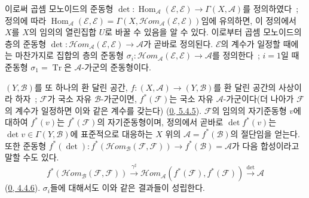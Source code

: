 \begin{env}[6.4.8]

이로써 곱셈 모노이드의 준동형
$\det:\operatorname{Hom}_{\mathcal{A}}(\mathcal{E},\mathcal{E})
\to\Gamma(X,\mathcal{A})$를 정의하였다~; 정의에 따라
$\operatorname{Hom}_{\mathcal{A}}(\mathcal{E},\mathcal{E})=
\Gamma(X,\mathcal{H}om_{\mathcal{A}}(\mathcal{E},\mathcal{E}))$임에
유의하면, 이 정의에서 $X$를 $X$의 임의의 열린집합 $U$로 바꿀 수
있음을 알 수 있다. 이로부터 곱셈 모노이드의 층의 준동형
$\det:\mathcal{H}om_{\mathcal{A}}(\mathcal{E},\mathcal{E})\to\mathcal{A}$가
곧바로 정의된다. $\mathcal{E}$의 계수가 일정할 때에는 마찬가지로
집합의 층의 준동형
$\sigma_i:\mathcal{H}om_{\mathcal{A}}(\mathcal{E},\mathcal{E})
\to\mathcal{A}$를 정의한다~; $i=1$일 때 준동형
$\sigma_1=\operatorname{Tr}$은 $\mathcal{A}$-가군의 준동형이다.

$(Y,\mathcal{B})$를 또 하나의 환 달린 공간,
$f:(X,\mathcal{A})\to(Y,\mathcal{B})$를 환 달린 공간의 사상이라 하자~;
$\mathcal{F}$가 국소 자유 $\mathcal{B}$-가군이면,
$f^*(\mathcal{F})$는 국소 자유 $\mathcal{A}$-가군이다(더 나아가
$\mathcal{F}$의 계수가 일정하면 이와 같은 계수를 갖는다)
(\hyperref[0.5.4.5-ko]{0, 5.4.5}). $\mathcal{F}$의 임의의 자기준동형
$v$에 대하여 $f^*(v)$는 $f^*(\mathcal{F})$의 자기준동형이며, 정의에서
곧바로 $\det f^*(v)$는 $\det v\in\Gamma(Y,\mathcal{B})$에 표준적으로
대응하는 $X$ 위의 $\mathcal{A}=f^*(\mathcal{B})$의 절단임을 얻는다.
또한 준동형
$f^*(\det):f^*(\mathcal{H}om_{\mathcal{B}}(\mathcal{F},\mathcal{F}))
\to f^*(\mathcal{B})=\mathcal{A}$가 다음 합성이라고 말할 수도 있다.
\[
f^*(\mathcal{H}om_{\mathcal{B}}(\mathcal{F},\mathcal{F}))
\xrightarrow{\gamma^\sharp}
\mathcal{H}om_{\mathcal{A}}(f^*(\mathcal{F}),f^*(\mathcal{F}))
\xrightarrow{\det}\mathcal{A}
\]
(\hyperref[0.4.4.6-ko]{0, 4.4.6}). $\sigma_i$들에 대해서도 이와 같은
결과들이 성립한다.
\end{env}

